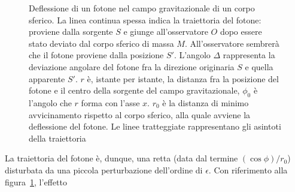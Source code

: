 \begin{figure}
  \centering
  \caption[Deflessione di un fotone nel campo gravitazionale di un corpo
  sferico]{Deflessione di un fotone nel campo gravitazionale di un corpo
    sferico.  La linea continua spessa indica la traiettoria del fotone:
    proviene dalla sorgente $S$ e giunge all'osservatore $O$ dopo essere stato
    deviato dal corpo sferico di massa $M$.  All'osservatore sembrerà che il
    fotone proviene dalla posizione $S'$.  L'angolo $\Delta$ rappresenta la
    deviazione angolare del fotone fra la direzione originaria $S$ e quella
    apparente $S'$.  $r$ è, istante per istante, la distanza fra la posizione
    del fotone e il centro della sorgente del campo gravitazionale, $\phi_{0}$ è
    l'angolo che $r$ forma con l'asse $x$.  $r_{0}$ è la distanza di minimo
    avvicinamento rispetto al corpo sferico, alla quale avviene la deflessione
    del fotone.  Le linee tratteggiate rappresentano gli asintoti della
    traiettoria}
  \label{fig:deflessione-fotone}
\end{figure}
La traiettoria del fotone è, dunque, una retta (data dal termine
$(\cos\phi)/r_{0}$) disturbata da una piccola perturbazione dell'ordine di
$\epsilon$.  Con riferimento alla figura~\ref{fig:deflessione-fotone}, l'effetto

